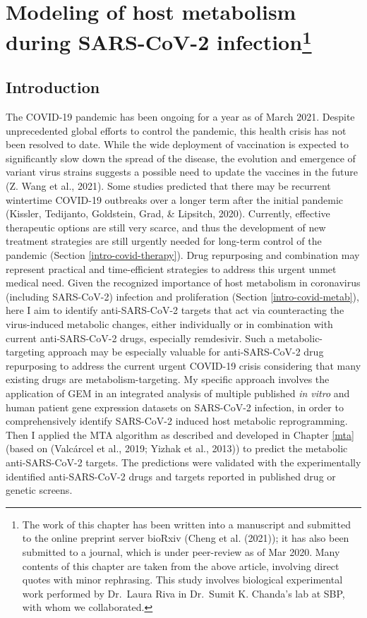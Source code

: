 \documentclass[12pt,twoside,openany,\mydriver]{thesis}  %
\begin{document}
\hypertarget{covid}{%
\chapter[Modeling of host metabolism during SARS-CoV-2 infection]{\texorpdfstring{Modeling of host metabolism during SARS-CoV-2 infection\footnote{The work of this chapter has been written into a manuscript and submitted to the online preprint server bioRxiv (Cheng et al. (2021)); it has also been submitted to a journal, which is under peer-review as of Mar 2020. Many contents of this chapter are taken from the above article, involving direct quotes with minor rephrasing. This study involves biological experimental work performed by Dr.~Laura Riva in Dr.~Sumit K. Chanda's lab at SBP, with whom we collaborated.}}{Modeling of host metabolism during SARS-CoV-2 infection}}\label{covid}}

\hypertarget{introduction-2}{%
\section{Introduction}\label{introduction-2}}

The COVID-19 pandemic has been ongoing for a year as of March 2021. Despite unprecedented global efforts to control the pandemic, this health crisis has not been resolved to date. While the wide deployment of vaccination is expected to significantly slow down the spread of the disease, the evolution and emergence of variant virus strains suggests a possible need to update the vaccines in the future (Z. Wang et al., 2021). Some studies predicted that there may be recurrent wintertime COVID-19 outbreaks over a longer term after the initial pandemic (Kissler, Tedijanto, Goldstein, Grad, \& Lipsitch, 2020). Currently, effective therapeutic options are still very scarce, and thus the development of new treatment strategies are still urgently needed for long-term control of the pandemic (Section \ref{intro-covid-therapy}). Drug repurposing and combination may represent practical and time-efficient strategies to address this urgent unmet medical need. Given the recognized importance of host metabolism in coronavirus (including SARS-CoV-2) infection and proliferation (Section \ref{intro-covid-metab}), here I aim to identify anti-SARS-CoV-2 targets that act via counteracting the virus-induced metabolic changes, either individually or in combination with current anti-SARS-CoV-2 drugs, especially remdesivir. Such a metabolic-targeting approach may be especially valuable for anti-SARS-CoV-2 drug repurposing to address the current urgent COVID-19 crisis considering that many existing drugs are metabolism-targeting. My specific approach involves the application of GEM in an integrated analysis of multiple published \emph{in vitro} and human patient gene expression datasets on SARS-CoV-2 infection, in order to comprehensively identify SARS-CoV-2 induced host metabolic reprogramming. Then I applied the MTA algorithm as described and developed in Chapter \ref{mta} (based on (Valcárcel et al., 2019; Yizhak et al., 2013)) to predict the metabolic anti-SARS-CoV-2 targets. The predictions were validated with the experimentally identified anti-SARS-CoV-2 drugs and targets reported in published drug or genetic screens.
\end{document}
